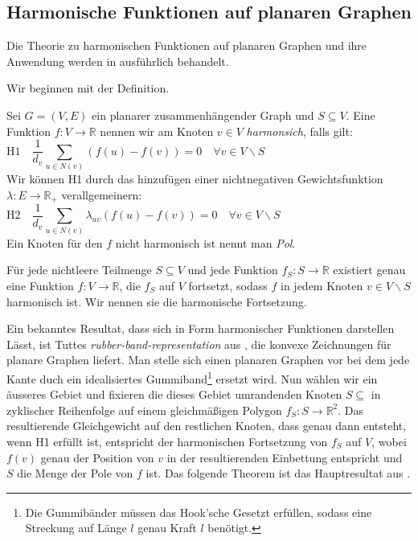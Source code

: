 \subsection{Harmonische Funktionen auf planaren Graphen}

Die Theorie zu harmonischen Funktionen auf planaren Graphen und ihre Anwendung werden in \cite{lov99} ausführlich behandelt.\

Wir beginnen mit der Definition.

\begin{definition}
Sei $G=(V,E)$ ein planarer zusammenhängender Graph und $S \subseteq V$. Eine Funktion $f:V \to \mathbb{R}$ nennen wir am Knoten $v \in V$ \textit{harmonsich}, falls gilt:
$$ \text{H1} \quad \frac{1}{d_v} \sum_{u \in N(v)}(f(u) - f(v)) = 0 \quad \forall v \in V \backslash S \qquad\qquad\qquad\qquad\qquad\qquad\quad\:\,\:$$
Wir können H1 durch das hinzufügen einer nichtnegativen Gewichtsfunktion $\lambda:E\to\mathbb{R}_+$ verallgemeinern:
$$ \text{H2}\quad\frac{1}{d_v} \sum_{u \in N(v)}\lambda_{uv}(f(u) - f(v)) = 0 \quad \forall v \in V \backslash S \qquad\qquad\qquad\qquad\qquad\qquad$$
Ein Knoten für den $f$ nicht harmonisch ist nennt man \textit{Pol}.
\end{definition}

\begin{theorem}\cite[Theorem 3.1.2]{lov99}\label{harmonic_uni}
Für jede nichtleere Teilmenge $S \subseteq V$ und jede Funktion $f_S:S\to\mathbb{R}$ existiert genau eine Funktion $f:V\to\mathbb{R}$, die $f_S$ auf $V$ fortsetzt, sodass $f$ in jedem Knoten $v\in V \backslash S$ harmonisch ist. Wir nennen sie die \textup{harmonische Fortsetzung}.
\end{theorem}

Ein bekanntes Resultat, dass sich in Form harmonischer Funktionen darstellen Lässt, ist Tuttes \textit{rubber-band-representation} aus \cite{tutte63}, die konvexe Zeichnungen für planare Graphen liefert. Man stelle sich einen planaren Graphen vor bei dem jede Kante duch ein idealisiertes Gummiband\footnote{Die Gummibänder müssen das Hook'sche Gesetzt erfüllen, sodass eine Streckung auf Länge $l$ genau Kraft $l$ benötigt.} ersetzt wird. Nun wählen wir ein äusseres Gebiet und fixieren die dieses Gebiet umrandenden Knoten $S\subseteq$ in zyklischer Reihenfolge auf einem gleichmäßigen Polygon $f_S:S \to \mathbb{R}^2$. Das resultierende Gleichgewicht auf den restlichen Knoten, dass genau dann entsteht, wenn H1 erfüllt ist, entspricht der harmonischen Fortsetzung von $f_S$  auf $V$, wobei $f(v)$ genau der Position von $v$ in der resultierenden Einbettung entspricht und $S$ die Menge der Pole von $f$ ist. Das folgende Theorem ist das Hauptresultat aus \cite{tutte63}.


